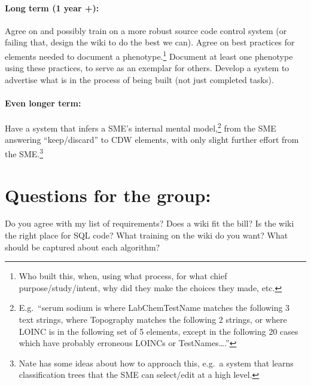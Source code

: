 \documentclass{tufte-handout}
\begin{document}
\paragraph{Long term (1 year +):}
Agree on and possibly train on a more robust source code control
system (or failing that, design the wiki to do the best we can). Agree
on best practices for elements needed to document a
phenotype.\footnote{Who built this, when, using what process, for what
  chief purpose/study/intent, why did they make the choices they made,
  etc.} Document at least one phenotype using these practices, to
serve as an exemplar for others. Develop a system to advertise what is
in the process of being built (not just completed tasks).

\paragraph{Even longer term:}
Have a system that infers a SME's internal mental
model,\footnote{E.g.\ ``serum sodium is where LabChemTestName matches
  the following 3 text strings, where Topography matches the following
  2 strings, or where LOINC is in the following set of 5 elements,
  except in the following 20 cases which have probably erroneous
  LOINCs or TestNames\ldots{}.''} from the SME answering
``keep/discard'' to CDW elements, with only slight further effort from
the SME.\footnote{Nate has some ideas about how to approach this,
  e.g.\ a system that learns classification trees that the SME can
  select/edit at a high level.}

\section{Questions for the group:}

Do you agree with my list of requirements? Does a wiki fit the bill?
Is the wiki the right place for SQL code? What training on the wiki do
you want? What should be captured about each algorithm?
\end{document}
